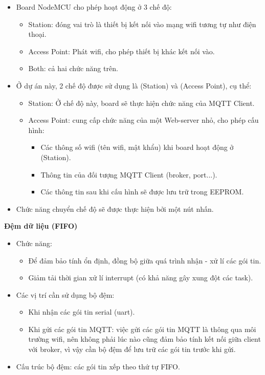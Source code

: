 \documentclass[a4paper,12pt,oneside]{article}
\begin{document}
	\begin{itemize}
	\item	Board NodeMCU cho phép hoạt động ở 3 chế độ:
		\begin{itemize}
		\item	Station: đóng vai trò là thiết bị kết nối vào mạng wifi tương tự như điện thoại.
		\item	Access Point: Phát wifi, cho phép thiết bị khác kết nối vào.
		\item	Both: cả hai chức năng trên.
		\end{itemize}

	\item	Ở dự án này, 2 chế độ được sử dụng là (Station) và (Access Point), cụ thể:
		\begin{itemize}
		\item	Station: Ở chế độ này, board sẽ thực hiện chức năng của MQTT Client.
		\item	Access Point: cung cấp chức năng của một Web-server nhỏ, cho phép cấu hình:
			\begin{itemize}
				\item	Các thông  số wifi (tên wifi, mật khẩu) khi board hoạt động ở (Station). 
				\item	Thông tin của đối tượng MQTT Client (broker, port...).
				\item	Các thông tin sau khi cấu hình sẽ được lưu trữ trong EEPROM.
			\end{itemize}
		\end{itemize}


	\item	Chức năng chuyển chế độ sẽ được thực hiện bởi một nút nhấn.

	\end{itemize}
				
\noindent	\textbf{Đệm dữ liệu (FIFO)}
	\begin{itemize}
	\item Chức năng:
		\begin{itemize}
		\item	Để đảm bảo tính ổn định, đồng bộ giữa quá trình nhận - xử lí các gói tin.
		\item	Giảm tải thời gian xử lí interrupt (có khả năng gây xung đột các task).
		\end{itemize}
	\item	Các vị trí cần sử dụng bộ đệm:
		\begin{itemize}
		\item	Khi  nhận các gói tin serial (uart).
		\item	Khi gửi các gói tin MQTT: việc gửi các gói tin MQTT là thông qua môi trường wifi, nên không phải lúc nào cũng đảm bảo tính kết nối giữa client với broker, vì vậy cần bộ đệm để lưu trữ các gói tin trước khi gửi.
		\end{itemize}
	\item	Cấu trúc bộ đệm: các gói tin xếp theo thứ tự FIFO.
	\end{itemize}
\end{document}
